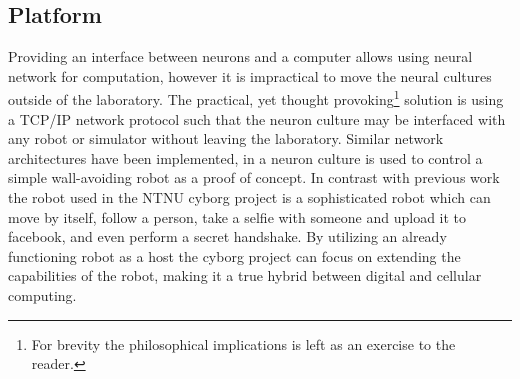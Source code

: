 \subsection{Platform}
Providing an interface between neurons and a computer allows using neural
network for computation, however it is impractical to move the neural cultures
outside of the laboratory.
The practical, yet thought provoking\footnote{For brevity the
  philosophical implications is left as an exercise to the reader.} solution is
using a TCP/IP network protocol such that the neuron culture may be interfaced with any
robot or simulator without leaving the laboratory.
Similar network architectures have been implemented, in
\cite{li_application_2015} a neuron culture is used to control a simple
wall-avoiding robot as a proof of concept.
In contrast with previous work the robot used in the NTNU cyborg project is a
sophisticated robot which can move by itself, follow a person, take a selfie
with someone and upload it to facebook, and even perform a secret handshake.
By utilizing an already functioning robot as a host the cyborg project can focus
on extending the capabilities of the robot, making it a true hybrid between
digital and cellular computing.
